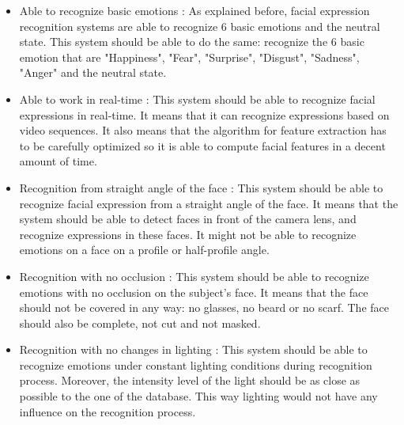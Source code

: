 \begin{itemize}
  \item Able to recognize basic emotions : 
  \noindent As explained before, facial expression recognition systems are able to recognize 6 basic emotions and the neutral state. This system should be able to do the same: recognize the 6 basic emotion that are "Happiness", "Fear", "Surprise", "Disgust", "Sadness", "Anger" and the neutral state.
\newline

  \item Able to work in real-time : 
  \noindent This system should be able to recognize facial expressions in real-time. It means that it can recognize expressions based on video sequences. It also means that the algorithm for feature extraction has to be carefully optimized so it is able to compute facial features in a decent amount of time. 
\newline

  \item Recognition from straight angle of the face : 
  \noindent This system should be able to recognize facial expression from a straight angle of the face. It means that the system should be able to detect faces in front of the camera lens, and recognize expressions in these faces. It might not be able to recognize emotions on a face on a profile or half-profile angle.
\newline

  \item Recognition with no occlusion : 
  \noindent This system should be able to recognize emotions with no occlusion on the subject's face. It means that the face should not be covered in any way: no glasses, no beard or no scarf. The face should also be complete, not cut and not masked.
\newline

  \item Recognition with no changes in lighting : 
  \noindent This system should be able to recognize emotions under constant lighting conditions during recognition process. Moreover, the intensity level of the light should be as close as possible to the one of the database. This way lighting would not have any influence on the recognition process.
\newline
\end{itemize}











